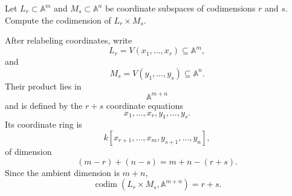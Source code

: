 \begin{problem}\label{prob:vi31-14}
Let \(L_r\subset\mathbb A^m\) and \(M_s\subset\mathbb A^n\) be coordinate subspaces of codimensions \(r\) and \(s\). Compute the codimension of \(L_r\times M_s\).
\end{problem}

\ifdefined\FullProblemDossiers
\begin{solution}
After relabeling coordinates, write
\[
L_r=V(x_1,\ldots,x_r)\subseteq\mathbb A^m,
\]
and
\[
M_s=V(y_1,\ldots,y_s)\subseteq\mathbb A^n.
\]
Their product lies in
\[
\mathbb A^{m+n}
\]
and is defined by the \(r+s\) coordinate equations
\[
x_1,\ldots,x_r,y_1,\ldots,y_s.
\]
Its coordinate ring is
\[
k[x_{r+1},\ldots,x_m,y_{s+1},\ldots,y_n],
\]
of dimension
\[
(m-r)+(n-s)=m+n-(r+s).
\]
Since the ambient dimension is \(m+n\),
\[
\boxed{
\operatorname{codim}(L_r\times M_s,\mathbb A^{m+n})=r+s.
}
\]
\end{solution}
\fi
